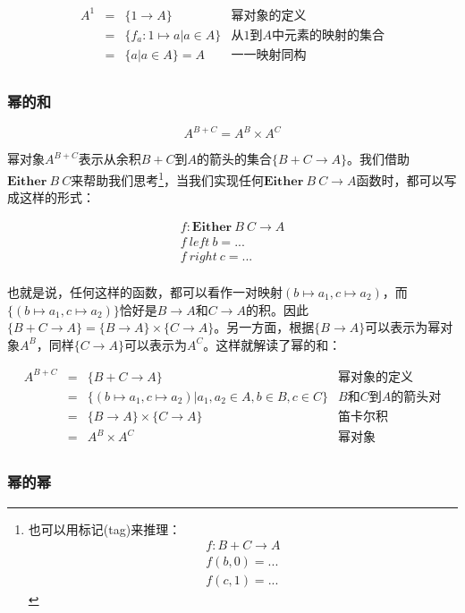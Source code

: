 \documentclass{article}
\begin{document}
\[
\begin{array}{rcll}
A^1 & = & \{ 1 \to A \} & \text{幂对象的定义} \\
    & = & \{ f_a : 1 \mapsto a | a \in A \} & \text{从1到$A$中元素的映射的集合} \\
    & = & \{ a | a \in A \} = A & \text{一一映射同构} \\
\end{array}
\]

\subsubsection{幂的和}

\[
  A^{B + C} = A^B \times A^C
\]

幂对象$A^{B + C}$表示从余积$B + C$到$A$的箭头的集合$\{B + C \to A\}$。我们借助$\mathbf{Either}\ B\ C$来帮助我们思考\footnote{也可以用标记(tag)来推理：
\[
\begin{array}{l}
f : B + C \to A \\
f (b, 0) = ... \\
f (c, 1) = ...
\end{array}
\]
}，当我们实现任何$\mathbf{Either}\ B\ C \to A$函数时，都可以写成这样的形式：

\[
\begin{array}{l}
f : \mathbf{Either}\ B\ C \to A \\
f\ left\ b = ... \\
f\ right\ c = ... \\
\end{array}
\]

也就是说，任何这样的函数，都可以看作一对映射$(b \mapsto a_1, c \mapsto a_2)$，而$\{(b \mapsto a_1, c \mapsto a_2)\}$恰好是$B \to A$和$C \to A$的积。因此$\{B + C \to A\} = \{B \to A\} \times \{C \to A\}$。另一方面，根据$\{B \to A\}$可以表示为幂对象$A^B$，同样$\{C \to A\}$可以表示为$A^C$。这样就解读了幂的和：

\[
\begin{array}{rcll}
A^{B + C} & = & \{ B + C \to A \} & \text{幂对象的定义} \\
    & = & \{ (b \mapsto a_1,  c \mapsto a_2) | a_1, a_2 \in A, b \in B, c \in C\} & \text{$B$和$C$到$A$的箭头对} \\
    & = & \{ B \to A \} \times \{ C \to A \} & \text{笛卡尔积} \\
    & = & A^B \times A^C & \text{幂对象} \\
\end{array}
\]

\subsubsection{幂的幂}
\end{document}
